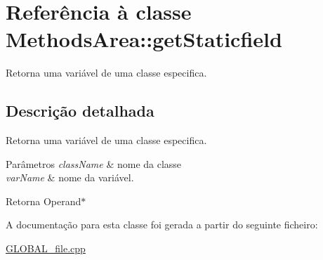 \hypertarget{class_methods_area_1_1get_staticfield}{}\section{Referência à classe Methods\+Area\+:\+:get\+Staticfield}
\label{class_methods_area_1_1get_staticfield}


Retorna uma variável de uma classe especifica.  




\subsection{Descrição detalhada}
Retorna uma variável de uma classe especifica. 


\begin{DoxyParams}{Parâmetros}
{\em class\+Name} & nome da classe \\
\hline
{\em var\+Name} & nome da variável. \\
\hline
\end{DoxyParams}
\begin{DoxyReturn}{Retorna}
Operand$\ast$ 
\end{DoxyReturn}


A documentação para esta classe foi gerada a partir do seguinte ficheiro\+:\begin{DoxyCompactItemize}
\item 
\hyperlink{_g_l_o_b_a_l__file_8cpp}{G\+L\+O\+B\+A\+L\+\_\+file.\+cpp}\end{DoxyCompactItemize}

